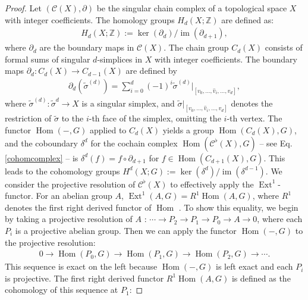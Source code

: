 \begin{proof}
Let $(\mathcal{C}(X),\partial)$ be the singular chain complex of a topological space $X$ with integer coefficients. The homology groups $H_{d}(X; \mathbb{Z})$ are defined as:
\begin{align}
H_{d}(X; \mathbb{Z}) := \ker(\partial_{d}) / \operatorname{im}(\partial_{d+1}),
\end{align}
where $\partial_{d}$ are the boundary maps in $\mathcal{C}(X)$. The chain group $C_{d}(X)$ consists of formal sums of singular $d$-simplices in $X$ with integer coefficients. The boundary maps $\partial_{d}: C_{d}(X) \rightarrow C_{d-1}(X)$ are defined by
\begin{align}
\partial_{d}(\tilde{\sigma}^{(d)}) = \sum_{i=0}^{d}(-1)^{i} \tilde{\sigma}^{(d)}|_{[v_0, \ldots, \hat{v}_i, \ldots, v_d]},
\end{align}
where $\tilde{\sigma}^{(d)}: \tilde{\sigma}^{d} \rightarrow X$ is a singular simplex, and $\tilde{\sigma}|_{[v_0, \ldots, \hat{v}_i, \ldots, v_d]}$ denotes the restriction of $\tilde{\sigma}$ to the $i$-th face of the simplex, omitting the $i$-th vertex. The functor $\operatorname{Hom}(-, G)$ applied to $C_{d}(X)$ yields a group $\operatorname{Hom}(C_{d}(X), G)$, and the coboundary $\delta^{d}$ for the cochain complex $\operatorname{Hom}(\mathcal{C}^\flat(X), G)$ -- see Eq. \ref{cohomcomplex} -- is $\delta^{d}(f) = f \circ \partial_{d+1}$ for $f \in \operatorname{Hom}(C_{d+1}(X), G)$. This leads to the cohomology groups $H^{d}(X; G) := \ker(\delta^{d}) / \operatorname{im}(\delta^{d-1})$. We consider the projective resolution of $\mathcal{C}^\flat(X)$ to effectively apply the $\operatorname{Ext}^1$-functor. For an abelian group $A$, $\operatorname{Ext}^{1}(A, G) = R^{1} \operatorname{Hom}(A, G)$, where $R^{1}$ denotes the first right derived functor of $\operatorname{Hom}$ \cite[Vista 3.4.6, \S 3.5]{Weibel1994}. To show this equality, we begin by taking a projective resolution of $A$ \cite[Definition 2.2.4]{Weibel1994}: $\cdots \to P_{2} \to P_{1} \to P_{0} \to A \to 0$, where each $P_{i}$ is a projective abelian group. Then we can apply the functor $\operatorname{Hom}(-, G)$ to the projective resolution:
\begin{align}
0 \to \operatorname{Hom}(P_{0}, G) \to \operatorname{Hom}(P_{1}, G) \to \operatorname{Hom}(P_{2}, G) \to \cdots.
\end{align}
This sequence is exact on the left because $\operatorname{Hom}(-, G)$ is left exact and each $P_{i}$ is projective. The first right derived functor $R^{1}\operatorname{Hom}(A, G)$ is defined as the cohomology of this sequence at $P_{1}$:

\end{proof}
